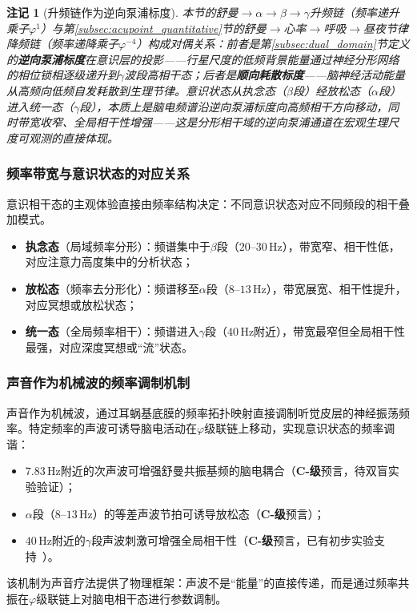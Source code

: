 \documentclass[12pt,a4paper,twocolumn]{article}
\renewcommand{\phi}{\varphi}
\newtheorem{remark}[theorem]{注记}
\begin{document}
\begin{remark}[升频链作为逆向泵浦标度]
\label{rmk:ascending_reverse_pump}
本节的舒曼$\to\alpha\to\beta\to\gamma$升频链（频率递升乘子$\phi^{1}$）与第\ref{subsec:acupoint_quantitative}节的舒曼$\to$心率$\to$呼吸$\to$昼夜节律降频链（频率递降乘子$\phi^{-4}$）构成对偶关系：前者是第\ref{subsec:dual_domain}节定义的\textbf{逆向泵浦标度}在意识层的投影——行星尺度的低频背景能量通过神经分形网络的相位锁相逐级递升到$\gamma$波段高相干态；后者是\textbf{顺向耗散标度}——脑神经活动能量从高频向低频自发耗散到生理节律。意识状态从执念态（$\beta$段）经放松态（$\alpha$段）进入统一态（$\gamma$段），本质上是脑电频谱沿逆向泵浦标度向高频相干方向移动，同时带宽收窄、全局相干性增强——这是分形相干域的逆向泵浦通道在宏观生理尺度可观测的直接体现。
\end{remark}

\subsubsection{频率带宽与意识状态的对应关系}
意识相干态的主观体验直接由频率结构决定：不同意识状态对应不同频段的相干叠加模式。
\begin{itemize}
\item \textbf{执念态}（局域频率分形）：频谱集中于$\beta$段（$20$--$30$\,Hz），带宽窄、相干性低，对应注意力高度集中的分析状态；
\item \textbf{放松态}（频率去分形化）：频谱移至$\alpha$段（$8$--$13$\,Hz），带宽展宽、相干性提升，对应冥想或放松状态；
\item \textbf{统一态}（全局频率相干）：频谱进入$\gamma$段（$40$\,Hz附近），带宽最窄但全局相干性最强，对应深度冥想或``流''状态。
\end{itemize}

\subsubsection{声音作为机械波的频率调制机制}
\label{subsec:sound_modulation}
声音作为机械波，通过耳蜗基底膜的频率拓扑映射直接调制听觉皮层的神经振荡频率。特定频率的声波可诱导脑电活动在$\phi$级联链上移动，实现意识状态的频率调谐：
\begin{itemize}
\item $7.83$\,Hz附近的次声波可增强舒曼共振基频的脑电耦合（\textbf{C-级}预言，待双盲实验验证）；
\item $\alpha$段（$8$--$13$\,Hz）的等差声波节拍可诱导放松态（\textbf{C-级}预言）；
\item $40$\,Hz附近的$\gamma$段声波刺激可增强全局相干性（\textbf{C-级}预言，已有初步实验支持~\cite{Zhu2025}）。
\end{itemize}
该机制为声音疗法提供了物理框架：声波不是``能量''的直接传递，而是通过频率共振在$\phi$级联链上对脑电相干态进行参数调制。
\end{document}
